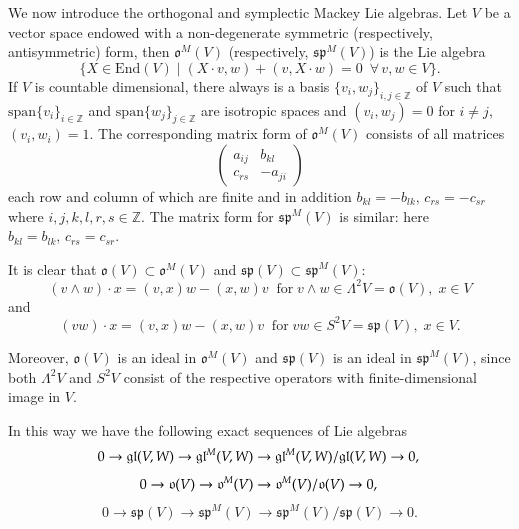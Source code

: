 \documentclass{svmult}
\newcommand {\ZZ} {\mathbb {Z}}
\renewcommand{\sp}{\mathfrak{sp}}
\newcommand{\oo}{\mathfrak{o}}
\renewcommand{\span}{\mathrm{span}}
\newcommand{\gl}{\mathfrak{gl}}
\newcommand{\End}{\mathrm{End}}
\begin{document}
We now introduce the orthogonal and symplectic Mackey Lie algebras. Let $V$ be a vector space endowed with a non-degenerate symmetric 
(respectively, antisymmetric) form, then $\oo^M(V)$ (respectively, $\sp^M(V)$) is the Lie algebra
\begin{equation}\label{rel:Liealg}
 \lbrace X \in \End(V)\;|\;(X\cdot v,w)+(v,X\cdot w)=0 \,\,\, \forall \, v,w \in V\rbrace.\nonumber
\end{equation}
If $V$ is countable dimensional, there always is a basis $\lbrace v_i,w_j\rbrace_{i,j \in \ZZ}$ of $V$ such that $\span\lbrace v_i\rbrace_{i \in \ZZ}$ and $\span\lbrace w_j\rbrace_{j \in \ZZ}$ are isotropic spaces and $(v_i, w_j) = 0$ for $i \neq j$, $(v_i, w_i)=1$. The corresponding matrix form of  $\oo^M(V)$ consists of all matrices
\begin{equation}\label{matrix}
\left(
\begin{array}{c|c}
 a_{ij} & b_{kl} \\ \hline
 c_{rs} & -a_{ji} 
\end{array}
\right) 
\end{equation}
each row and column of which are finite and in addition $b_{kl}=-b_{lk},\,c_{rs}=-c_{sr}$ where $i,j,k,l,r,s \in \ZZ$. The matrix form for $\sp^M(V)$ is similar: 
here $b_{kl} = b_{lk},\,c_{rs}=c_{sr}$.

It is clear that $\oo(V)\subset \oo^M(V)$ and
$\sp(V)\subset\sp^M(V)$:
\begin{equation}\label{eq:v_wedge_x}
 (v\wedge w)\cdot x = (v,x)w - (x,w)v \;\;\mathrm{for}\; v\wedge w \in \Lambda^2V = \oo(V),\;x\in V\nonumber
\end{equation}
and
\begin{equation}
 (vw)\cdot x = (v,x)w - (x,w)v \;\;\mathrm{for}\; vw \in S^2V = \sp(V),\;x \in V.\nonumber
\end{equation}


Moreover,  $\oo(V)$ is an ideal in $\oo^M(V)$ and $\sp(V)$ is an ideal in $\sp^M(V)$, since both $\Lambda^2 V$ and $S^2V$ consist of the respective operators with finite-dimensional image in $V$.

In this way we have the following exact sequences of Lie algebras
\begin{equation}\label{seq:Lalg1}
 0 \rightarrow \gl(V,W) \rightarrow \gl^M(V,W) \rightarrow \gl^M(V,W) /\gl(V,W)  \rightarrow 0,  \nonumber\\
\end{equation}
\begin{equation}\label{seq:Lalg2}
0 \rightarrow \oo(V) \rightarrow \oo^M(V) \rightarrow \oo^M(V) / \oo(V) \rightarrow 0,  \nonumber\\ 
\end{equation}
\begin{equation}\label{seq:Lalg3}
0 \rightarrow \sp(V) \rightarrow \sp^M(V) \rightarrow \sp^M(V) / \sp(V) \rightarrow 0. \nonumber
\end{equation}
\end{document}
